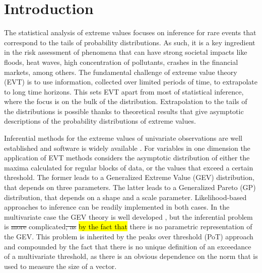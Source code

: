 \documentclass[iicol,sn-basic]{sn-jnl}
\theoremstyle{thmstyleone}
\begin{document}

\section{Introduction}

The statistical analysis of extreme values focuses on inference for rare events that correspond to the tails of probability distributions. As such, it is a key ingredient in the risk assessment of phenomena that can have strong societal impacts like floods, heat waves, high concentration of pollutants, crashes in the financial markets, among others. The fundamental challenge of extreme value theory (EVT) is to use information, collected over limited periods of time, to extrapolate to long time horizons. This sets EVT apart from most of statistical inference, where the focus is on the bulk of the distribution. Extrapolation to the tails of the distributions is possible thanks to theoretical results that give asymptotic descriptions of the probability distributions of extreme values.

Inferential methods for the extreme values of univariate observations are well established and software is widely available \cite[see, for example,][]{coles2001}. For variables in one dimension the application of EVT methods considers the asymptotic distribution of either the maxima calculated for regular blocks of data, or the values that exceed a certain threshold. The former leads to a Generalized Extreme Value (GEV) distribution, that depends on three parameters. The latter leads to a Generalized Pareto (GP) distribution, that depends on a shape and a scale parameter.  Likelihood-based approaches to inference can be readily implemented in both cases. In the multivariate case the GEV theory is well developed \citep[see, for example][]{dehaan2006}, but the inferential problem is \st{more} complicated\st{, as} \hl{by the fact that} there is no parametric representation of the GEV. This problem is inherited by the peaks over threshold (PoT) approach and compounded by the fact that there is no unique definition of an exceedance of a multivariate threshold, as there is an obvious dependence on the norm that is used to measure the size of a vector.
\end{document}
